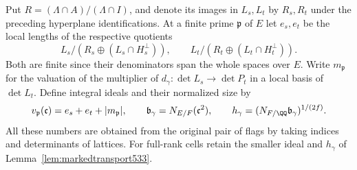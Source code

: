 \documentclass[a4paper,11pt]{article}
\theoremstyle{definition}
\theoremstyle{remark}
\numberwithin{equation}{section}
\begin{document}
Put \(R=(\Lambda\cap A)/(\Lambda\cap I)\), and denote its images
in \(L_s,L_t\) by \(R_s,R_t\) under the preceding hyperplane
identifications. At a finite prime \(\mathfrak p\) of \(E\) let
\(e_s,e_t\) be the local lengths of the respective quotients
\[
  L_s/(R_s\oplus(L_s\cap H_s^\perp)),\qquad
  L_t/(R_t\oplus(L_t\cap H_t^\perp)).
\]
Both are finite since their denominators span the whole spaces
over \(E\). Write \(m_{\mathfrak p}\) for the valuation of the
multiplier of \(d_\gamma:\det L_s\to\det P_t\) in a local basis
of \(\det L_t\). Define integral ideals and their normalized size by
\[
  v_{\mathfrak p}(\mathfrak c)=e_s+e_t+|m_{\mathfrak p}|,
       \qquad \mathfrak b_\gamma=N_{E/F}(\mathfrak c^2),
       \qquad h_\gamma=(N_{F/\QQ}\mathfrak b_\gamma)^{1/(2f)} .
\]
All these numbers are obtained from the original pair of
flags by taking indices and determinants of lattices. For
full-rank cells retain the smaller ideal and \(h_\gamma\)
of Lemma~\ref{lem:markedtransport533}.
\end{document}
